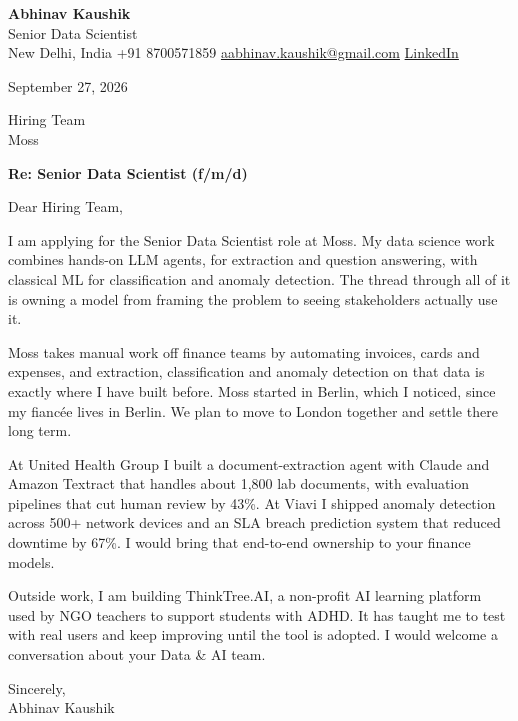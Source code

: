 \documentclass[11pt,a4paper]{article}
\begin{document}
{\Large\bfseries Abhinav Kaushik}\\
Senior Data Scientist\\
New Delhi, India \textbar{} +91 8700571859 \textbar{} \href{mailto:aabhinav.kaushik@gmail.com}{aabhinav.kaushik@gmail.com} \textbar{} \href{https://www.linkedin.com/in/abhinav-kaushik10/}{LinkedIn}  

September 27, 2026

Hiring Team\\
Moss

\textbf{Re: Senior Data Scientist (f/m/d)}

Dear Hiring Team,

I am applying for the Senior Data Scientist role at Moss. My data science work combines hands-on LLM agents, for extraction and question answering, with classical ML for classification and anomaly detection. The thread through all of it is owning a model from framing the problem to seeing stakeholders actually use it.

Moss takes manual work off finance teams by automating invoices, cards and expenses, and extraction, classification and anomaly detection on that data is exactly where I have built before. Moss started in Berlin, which I noticed, since my fiancée lives in Berlin. We plan to move to London together and settle there long term.

At United Health Group I built a document-extraction agent with Claude and Amazon Textract that handles about 1,800 lab documents, with evaluation pipelines that cut human review by 43\%. At Viavi I shipped anomaly detection across 500+ network devices and an SLA breach prediction system that reduced downtime by 67\%. I would bring that end-to-end ownership to your finance models.

Outside work, I am building ThinkTree.AI, a non-profit AI learning platform used by NGO teachers to support students with ADHD. It has taught me to test with real users and keep improving until the tool is adopted. I would welcome a conversation about your Data \& AI team.

Sincerely,\\[4pt]
Abhinav Kaushik
\end{document}
